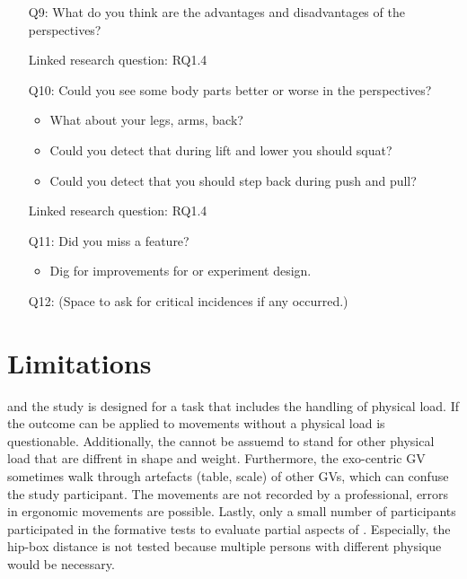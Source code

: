 \begin{itemize}
	\item[Q9:] What do you think are the advantages and disadvantages of the perspectives?
	\item[] Linked research question: RQ1.4
	
	\item[Q10:] Could you see some body parts better or worse in the perspectives?
	\begin{itemize}
		\item What about your legs, arms, back?
		\item Could you detect that during lift and lower you should squat?
		\item Could you detect that you should step back during push and pull?
	\end{itemize}
	\item[] Linked research question: RQ1.4
	
	\item[Q11:] Did you miss a feature?
	\begin{itemize}
		\item Dig for improvements for \exgo or experiment design.
	\end{itemize}
	
	\item[Q12:] (Space to ask for critical incidences if any occurred.)
\end{itemize}

\section{Limitations}
\label{sec:limitations}
\exgo and the study is designed for a task that includes the handling of physical load. If the outcome can be applied to movements without a physical load is questionable. Additionally, the cannot be assuemd to stand for other physical load that are diffrent in shape and weight. Furthermore, the exo-centric GV sometimes walk through artefacts (table, scale) of other GVs, which can confuse the study participant. The movements are not recorded by a professional, errors in ergonomic movements are possible. Lastly, only a small number of participants participated in the formative tests to evaluate partial aspects of \exgo. Especially, the hip-box distance is not tested because multiple persons with different physique would be necessary.\\

